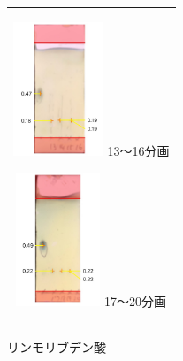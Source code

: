 \documentclass[a4paper,papersize,dvipdfmx]{jsarticle}
\begin{document}
\begin{figure}[H]
\begin{center}
\begin{tabular}{c}
\begin{minipage}{0.06\hsize}
        \hspace{2mm}
      \end{minipage}

\begin{minipage}{0.15\hsize}
\begin{center}
\includegraphics[clip, height=4cm]{imgs5/tlc-r4.jpg}
\hspace{1.6cm} 13〜16分画
\end{center}
\end{minipage}

\begin{minipage}{0.06\hsize}
        \hspace{2mm}
      \end{minipage}

\begin{minipage}{0.15\hsize}
\begin{center}
\includegraphics[clip, height=4cm]{imgs5/tlc-r5.jpg}
\hspace{1.6cm} 17〜20分画
\end{center}
\end{minipage}

\end{tabular}
\caption{リンモリブデン酸}
\end{center}
\end{figure}


\
\end{document}
